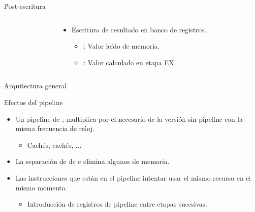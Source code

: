 \begin{frame}[t]{Post-escritura}
\begin{columns}
\begin{column}{.3\textwidth}

\end{column}
\begin{column}{.7\textwidth}
\begin{itemize}
  \item Escritura de resultado en banco de registros.
    \begin{itemize}
      \item {}:
            Valor leído de memoria.
      \item {}:
            Valor calculado en etapa EX.
    \end{itemize}
\end{itemize}
\end{column}
\end{columns}
\end{frame}

\begin{frame}[t]{Arquitectura general}

\end{frame}

\begin{frame}[t]{Efectos del pipeline}
\begin{itemize}
  \item Un pipeline de  , 
  multiplica por  el  
  necesario de la versión sin pipeline con la misma frecuencia de reloj.
    \begin{itemize}
      \item Cachés, cachés, ...
    \end{itemize}
  \item La separación de  de  e 
         elimina algunos  
        de memoria.
  \item Las instrucciones que están en el pipeline 
        intentar usar el mismo recurso en el mismo momento.
    \begin{itemize}
      \item Introducción de registros de pipeline entre etapas sucesivas.
    \end{itemize}
\end{itemize}
\end{frame}

